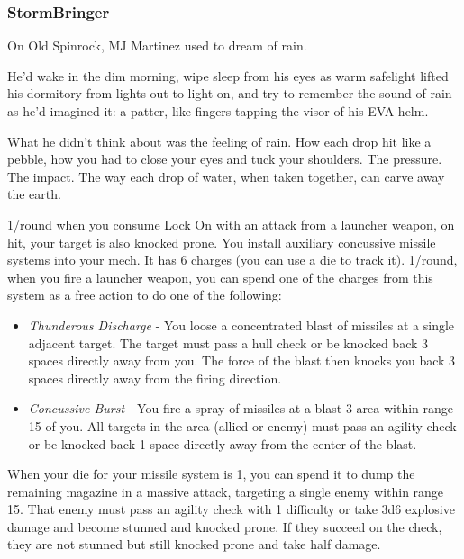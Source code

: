 \subsubsection{StormBringer}

\begin{talent}
{On Old Spinrock, MJ Martinez used to dream of rain.

He’d wake in the dim morning, wipe sleep from his eyes as warm safelight lifted his dormitory from lights-out to light-on, and try to remember the sound of rain as he’d imagined it: a patter, like fingers tapping the visor of his EVA helm.

What he didn’t think about was the feeling of rain. How each drop hit like a pebble, how you had to close your eyes and tuck your shoulders. The pressure. The impact. The way each drop of water, when taken together, can carve away the earth.}

1/round when you consume Lock On with an attack from a launcher weapon, on hit, your target is also knocked prone. 
You install auxiliary concussive missile systems into your mech. It has 6 charges (you can use a die to track it). 1/round, when you fire a launcher weapon, you can spend one of the charges from this system as a free action to do one of the following: 
\begin{itemize}
\item \textit{Thunderous Discharge} - You loose a concentrated blast of missiles at a single adjacent target. The target must pass a hull check or be knocked back 3 spaces directly away from you. The force of the blast then knocks you back 3 spaces directly away from the firing direction. 
\item \textit{Concussive Burst} - You fire a spray of missiles at a blast 3 area within range 15 of you. All targets in the area (allied or enemy) must pass an agility check or be knocked back 1 space directly away from the center of the blast.
\end{itemize}
When your die for your missile system is 1, you can spend it to dump the remaining magazine in a massive attack, targeting a single enemy within range 15. That enemy must pass an agility check with 1 difficulty or take 3d6 explosive damage and become stunned and knocked prone. If they succeed on the check, they are not stunned but still knocked prone and take half damage.
\end{talent}

